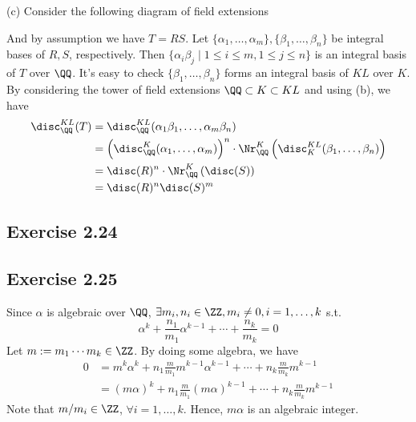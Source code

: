 \documentclass[../Chapter.tex]{subfiles}
\begin{document}
(c) Consider the following diagram of field extensions
\begin{center}
\end{center}
And by assumption we have $T=RS$. Let $\{\alpha_1,\ldots,\alpha_m\},\{\beta_1,\ldots,\beta_n\}$ be integral bases of $R,S$, respectively. Then $\{\alpha_i\beta_j\mid 1\leq i\leq m, 1\leq j\leq n\}$ is an integral basis of $T$ over $\QQ$. It's easy to check $\{\beta_1,\ldots,\beta_n\}$ forms an integral basis of $KL$ over $K$. By considering the tower of field extensions $\QQ\subset K\subset KL$ and using (b), we have
\begin{align*}
\disc^{KL}_\QQ(T) &= \disc^{KL}_\QQ(\alpha_1\beta_1,\ldots,\alpha_m\beta_n)\\
&= \left(\disc^K_\QQ(\alpha_1,\ldots,\alpha_m)\right)^n\cdot \Nr^K_\QQ\left(\disc^{KL}_K(\beta_1,\ldots,\beta_n)\right)\\
&= \disc(R)^n\cdot \Nr^K_\QQ\left(\disc(S)\right)\\
&= \disc(R)^n\disc(S)^m
\end{align*}

\subsection*{Exercise 2.24}

\subsection*{Exercise 2.25}

Since $\alpha$ is algebraic over $\QQ$, $\exists m_i,n_i \in \ZZ, m_i \neq 0, i=1,\ldots,k$ s.t. $$\alpha^k + \frac{n_1}{m_1}\alpha^{k-1} + \cdots + \frac{n_k}{m_k} = 0$$ 
Let $m:=m_1\cdots m_k\in\ZZ$. By doing some algebra, we have
\begin{align*}
0 &= m^k\alpha^k + n_1\frac{m}{m_1}m^{k-1}\alpha^{k-1} + \cdots + n_k\frac{m}{m_k}m^{k-1} \\
&= (m\alpha)^k + n_1\frac{m}{m_1}(m\alpha)^{k-1} + \cdots + n_k\frac{m}{m_k}m^{k-1}
\end{align*}
Note that $m/m_i \in \ZZ$, $\forall i=1,\ldots,k$. Hence, $m\alpha$ is an algebraic integer.
\end{document}
